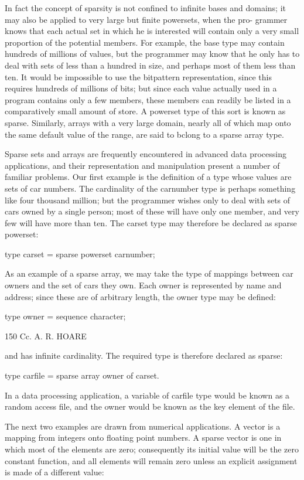 {{		In fact the concept of sparsity is not confined to infinite bases and domains; it may also be applied to very large but finite powersets, when the pro- grammer knows that each actual set in which he is interested will contain only a very small proportion of the potential members. For example, the base type may contain hundreds of millions of values, but the programmer may know that he only has to deal with sets of less than a hundred in size, and perhaps most of them less than ten. It would be impossible to use the bitpattern representation, since this requires hundreds of millions of bits; but since each value actually used in a program contains only a few members, these members can readily be listed in a comparatively small amount of store. A powerset type of this sort is known as sparse. Similarly, arrays with a very large domain, nearly all of which map onto the same default value of the range, are said to bclong to a sparse array type.
		
		Sparse sets and arrays are frequently encountered in advanced data processing applications, and their representation and manipulation present a number of familiar problems. Our first example is the definition of a type whose values are sets of car numbers. The cardinality of the carnumber type is perhaps something like four thousand million; but the programmer wishes only to deal with sets of cars owned by a single person; most of these will have only one member, and very few will have more than ten. The carset type may therefore be declared as sparse powerset:
		
		type carset = sparse powerset carnumber;
		
		As an example of a sparse array, we may take the type of mappings between car owners and the set of cars they own. Each owner is represented by name and address; since these are of arbitrary length, the owner type may be defined:
		
		type owner = sequence character;
		
		150 Cc. A. R. HOARE
		
		and has infinite cardinality. The required type is therefore declared as sparse:
		
		type carfile = sparse array owner of carset.
		
		In a data processing application, a variable of carfile type would be known as a random access file, and the owner would be known as the key element of the file.
		
		The next two examples are drawn from numerical applications. A vector is a mapping from integers onto floating point numbers. A sparse vector is one in which most of the elements are zero; consequently its initial value will be the zero constant function, and all elements will remain zero unless an explicit assignment is made of a different value:
		
}}
